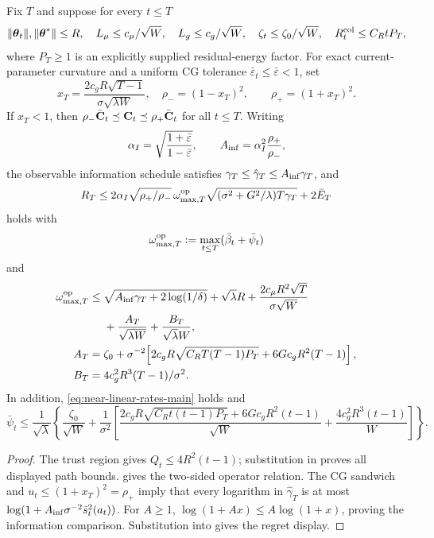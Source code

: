 \begin{corollary}\label{cor:near-linear}
Fix $T$ and suppose for every $t\le T$
\[
 \|\boldsymbol{\theta}_t\|,\|\boldsymbol{\theta}^*\|\le R,\quad
 L_\mu\le c_\mu/\sqrt W,\quad L_g\le c_g/\sqrt W,\quad
 \zeta_t\le\zeta_0/\sqrt W,\quad
 R_t^{\rm col}\le C_RtP_T ,
\]
where $P_T\ge1$ is an explicitly supplied residual-energy factor.  For exact
current-parameter curvature and a uniform CG tolerance
$\bar\varepsilon_t\le\bar\varepsilon<1$, set
\[
 x_T=\frac{2c_gR\sqrt{T-1}}{\sigma\sqrt{\lambda W}},\quad
 \rho_-=(1-x_T)^2,\qquad
 \rho_+=(1+x_T)^2.
\]
If $x_T<1$, then
$\rho_-\bar{\mathbf{C}}_t\preceq\mathbf{C}_t\preceq\rho_+\bar{\mathbf{C}}_t$ for all $t\le T$.
Writing
\[
 \alpha_I=\sqrt{\frac{1+\bar\varepsilon}{1-\bar\varepsilon}},\qquad
 A_{\rm inf}=\alpha_I^2\frac{\rho_+}{\rho_-},
\]
the observable information schedule satisfies
$\gamma_T\le\hat\gamma_T\le A_{\rm inf}\gamma_T$, and
\begin{equation}\label{eq:near-linear-regret-gamma}
R_T\le2\alpha_I\sqrt{\rho_+/\rho_-}\,\omega_{\max,T}^{\rm op}
 \sqrt{(\sigma^2+G^2/\lambda)T\gamma_T}+2\bar E_T
\end{equation}
holds with
\[\omega_{\max,T}^{\rm op}:=
\max_{t\le T}(\bar\beta_t+\bar\psi_t)\]
and
\begin{align*}
 \omega_{\max,T}^{\rm op}\le{}&
 \sqrt{A_{\rm inf}\gamma_T+2\log(1/\delta)}+\sqrt\lambda R
 +\frac{2c_\mu R^2\sqrt T}{\sigma\sqrt W}\\
 &+\frac{A_T}{\sqrt{\lambda W}}+\frac{B_T}{\sqrt\lambda W},\\
 A_T={}&\zeta_0+\sigma^{-2}\!\left[
 2c_gR\sqrt{C_RT(T-1)P_T}+6Gc_gR^2(T-1)\right],\\
 B_T={}&4c_g^2R^3(T-1)/\sigma^2 .
\end{align*}
In addition, \eqref{eq:near-linear-rates-main} holds and
\[
 \bar\psi_t\le\frac1{\sqrt\lambda}\!\left\{
 \frac{\zeta_0}{\sqrt W}+\frac1{\sigma^2}\!\left[
 \frac{2c_gR\sqrt{C_Rt(t-1)P_T}+6Gc_gR^2(t-1)}{\sqrt W}
 +\frac{4c_g^2R^3(t-1)}{W}\right]\right\}.
\]
\end{corollary}
\begin{proof}
The trust region gives $Q_t\le4R^2(t-1)$; substitution in
 proves all displayed path bounds.
 gives the two-sided operator relation.
The CG sandwich and $u_t\le(1+x_T)^2=\rho_+$ imply that every logarithm in
$\hat\gamma_T$ is at most
$\log(1+A_{\rm inf}\sigma^{-2}\bar s_t^2(a_t))$.
For $A\ge1$, $\log(1+Ax)\le A\log(1+x)$, proving the information comparison.
Substitution into  gives the regret display.
\end{proof}

